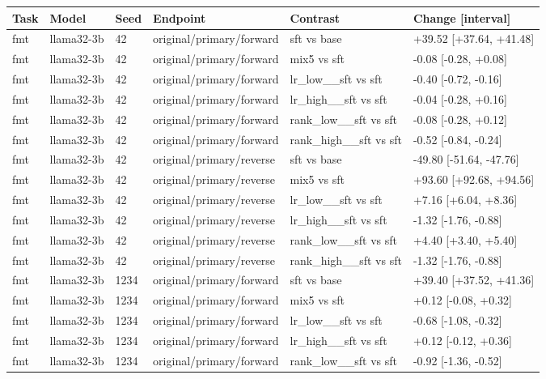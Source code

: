 \begin{table}[t]
\centering\small
\begin{tabular}{llllll}
\toprule
Task & Model & Seed & Endpoint & Contrast & Change [interval] \\
\midrule
fmt & llama32-3b & 42 & original/primary/forward & sft vs base & +39.52 [+37.64, +41.48] \\
fmt & llama32-3b & 42 & original/primary/forward & mix5 vs sft & -0.08 [-0.28, +0.08] \\
fmt & llama32-3b & 42 & original/primary/forward & lr\_low\_\_sft vs sft & -0.40 [-0.72, -0.16] \\
fmt & llama32-3b & 42 & original/primary/forward & lr\_high\_\_sft vs sft & -0.04 [-0.28, +0.16] \\
fmt & llama32-3b & 42 & original/primary/forward & rank\_low\_\_sft vs sft & -0.08 [-0.28, +0.12] \\
fmt & llama32-3b & 42 & original/primary/forward & rank\_high\_\_sft vs sft & -0.52 [-0.84, -0.24] \\
fmt & llama32-3b & 42 & original/primary/reverse & sft vs base & -49.80 [-51.64, -47.76] \\
fmt & llama32-3b & 42 & original/primary/reverse & mix5 vs sft & +93.60 [+92.68, +94.56] \\
fmt & llama32-3b & 42 & original/primary/reverse & lr\_low\_\_sft vs sft & +7.16 [+6.04, +8.36] \\
fmt & llama32-3b & 42 & original/primary/reverse & lr\_high\_\_sft vs sft & -1.32 [-1.76, -0.88] \\
fmt & llama32-3b & 42 & original/primary/reverse & rank\_low\_\_sft vs sft & +4.40 [+3.40, +5.40] \\
fmt & llama32-3b & 42 & original/primary/reverse & rank\_high\_\_sft vs sft & -1.32 [-1.76, -0.88] \\
fmt & llama32-3b & 1234 & original/primary/forward & sft vs base & +39.40 [+37.52, +41.36] \\
fmt & llama32-3b & 1234 & original/primary/forward & mix5 vs sft & +0.12 [-0.08, +0.32] \\
fmt & llama32-3b & 1234 & original/primary/forward & lr\_low\_\_sft vs sft & -0.68 [-1.08, -0.32] \\
fmt & llama32-3b & 1234 & original/primary/forward & lr\_high\_\_sft vs sft & +0.12 [-0.12, +0.36] \\
fmt & llama32-3b & 1234 & original/primary/forward & rank\_low\_\_sft vs sft & -0.92 [-1.36, -0.52] \\

\end{tabular}
\end{table}
